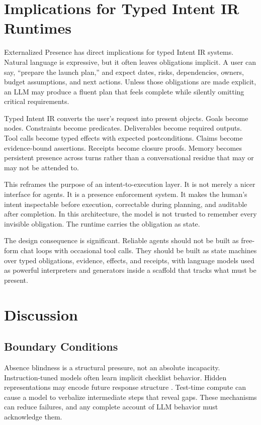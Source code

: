 \documentclass[10pt,conference]{IEEEtran}
\begin{document}
\section{Implications for Typed Intent IR Runtimes}
Externalized Presence has direct implications for typed Intent IR systems. Natural language is expressive, but it often leaves obligations implicit. A user can say, ``prepare the launch plan,'' and expect dates, risks, dependencies, owners, budget assumptions, and next actions. Unless those obligations are made explicit, an LLM may produce a fluent plan that feels complete while silently omitting critical requirements.

Typed Intent IR converts the user's request into present objects. Goals become nodes. Constraints become predicates. Deliverables become required outputs. Tool calls become typed effects with expected postconditions. Claims become evidence-bound assertions. Receipts become closure proofs. Memory becomes persistent presence across turns rather than a conversational residue that may or may not be attended to.

This reframes the purpose of an intent-to-execution layer. It is not merely a nicer interface for agents. It is a presence enforcement system. It makes the human's intent inspectable before execution, correctable during planning, and auditable after completion. In this architecture, the model is not trusted to remember every invisible obligation. The runtime carries the obligation as state.

The design consequence is significant. Reliable agents should not be built as free-form chat loops with occasional tool calls. They should be built as state machines over typed obligations, evidence, effects, and receipts, with language models used as powerful interpreters and generators inside a scaffold that tracks what must be present.

\section{Discussion}
\subsection{Boundary Conditions}
Absence blindness is a structural pressure, not an absolute incapacity. Instruction-tuned models often learn implicit checklist behavior. Hidden representations may encode future response structure \cite{heo2025know,dong2025emergent}. Test-time compute can cause a model to verbalize intermediate steps that reveal gaps. These mechanisms can reduce failures, and any complete account of LLM behavior must acknowledge them.
\end{document}
